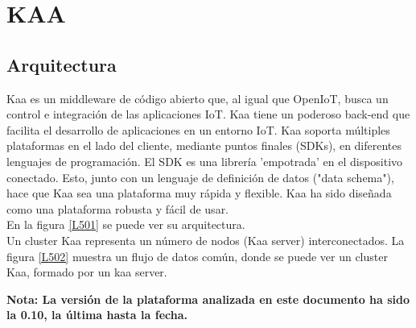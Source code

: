 \documentclass[12pt, twoside]{book}
\begin{document}
\chapter{KAA}
\section{Arquitectura}
Kaa es un middleware de código abierto que, al igual que OpenIoT, busca un control e integración de las aplicaciones IoT. Kaa tiene un poderoso back-end que facilita el desarrollo de aplicaciones en un entorno IoT. Kaa soporta múltiples plataformas en el lado del cliente, mediante puntos finales (SDKs), en diferentes lenguajes de programación. El SDK es una librería 'empotrada' en el dispositivo conectado. Esto, junto con un lenguaje de definición de datos ("data schema"), hace que Kaa sea una plataforma muy rápida y flexible. Kaa ha sido diseñada como una plataforma robusta y fácil de usar.\\ En la figura \ref{L501} se puede ver su arquitectura.\\
Un cluster Kaa representa un número de nodos (Kaa server) interconectados. La figura \ref{L502} muestra un flujo de datos común, donde se puede ver un cluster Kaa, formado por un kaa server.  



\textbf{Nota: La versión de la plataforma analizada en este documento ha sido la 0.10, la última hasta la fecha.}
\end{document}
